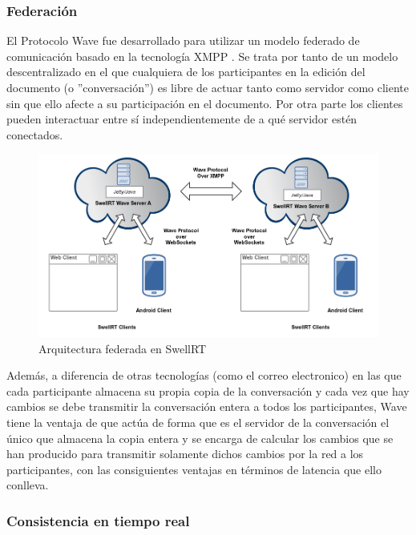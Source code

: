     \subsubsection{Federación}\label{sssec:federation}
    
    El Protocolo Wave \cite{ref:wave_over_xmpp} fue desarrollado para utilizar un modelo federado \cite{ref:wave_federation} \cite{ref:wave_white_paper} de comunicación basado en la tecnología XMPP \cite{ref:xmpp} \cite{ref:wave_over_xmpp}. Se trata por tanto de un modelo descentralizado en el que cualquiera de los participantes en la edición del documento (o ''conversación'') es libre de actuar tanto como servidor como cliente sin que ello afecte a su participación en el documento. Por otra parte los clientes pueden interactuar entre sí independientemente de a qué servidor estén conectados.
    
    	\begin{figure}[H]
	  \centering
	    \includegraphics[keepaspectratio, scale=0.4]{Media/Diagrams/federationSwellRTDiagram.png}
	  \caption{Arquitectura federada en SwellRT}
	  \label{fig:federatedArchitecture}
	\end{figure}	
    
    Además, a diferencia de otras tecnologías (como el correo electronico) en las que cada participante almacena su propia copia de la conversación y cada vez que hay cambios se debe transmitir la conversación entera a todos los participantes, Wave tiene la ventaja de que actúa de forma que es el servidor de la conversación el único que almacena la copia entera y se encarga de calcular los cambios que se han producido para transmitir solamente dichos cambios por la red a los participantes, con las consiguientes ventajas en términos de latencia que ello conlleva. 

    \subsubsection{Consistencia en tiempo real}\label{sssec:realTime}
    
